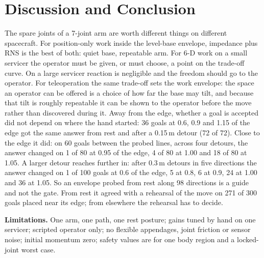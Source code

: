 \documentclass[conference]{IEEEtran}
\begin{document}
\section{Discussion and Conclusion}
The spare joints of a 7-joint arm are worth different things on different spacecraft. For
position-only work inside the level-base envelope, impedance plus RNS is the best of both: quiet base,
repeatable arm. For 6-D
work on a small servicer the operator must be given, or must choose, a point on the trade-off
curve. On a large servicer reaction is negligible and the freedom should go to the operator.
For teleoperation the same trade-off sets the work envelope: the space an operator can be offered
is a choice of how far the base may tilt, and because that tilt is roughly repeatable it can be shown to
the operator before the move rather than discovered during it. Away from the edge, whether a goal is accepted
did not depend on where the hand started: 36 goals at 0.6, 0.9 and 1.15 of the edge got the same answer from
rest and after a 0.15\,m detour (72 of 72). Close to the edge it did: on 60 goals between the probed lines,
across four detours, the answer changed on 1 of 80 at 0.95 of the edge, 4 of 80 at 1.00 and 18 of 80 at 1.05.
A larger detour reaches further in: after 0.3\,m detours in five directions the answer changed on 1 of 100
goals at 0.6 of the edge, 5 at 0.8, 6 at 0.9, 24 at 1.00 and 36 at 1.05. So an envelope probed from rest
along 98 directions is a guide and not the gate. From rest it agreed with a rehearsal of the move on 271 of
300 goals placed near its edge; from elsewhere the rehearsal has to decide.

\textbf{Limitations.} One arm, one path, one rest posture; gains tuned by hand on one servicer;
scripted operator only; no flexible appendages, joint friction or sensor noise; initial momentum
zero; safety values are for one body region and a locked-joint worst case.
\end{document}
